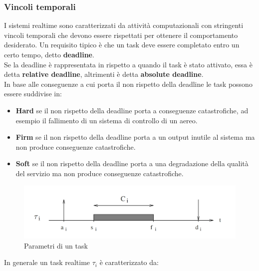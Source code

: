 \documentclass[12pt]{article}
\begin{document}
\subsubsection{Vincoli temporali}
I sistemi realtime sono caratterizzati da attività computazionali con stringenti vincoli temporali che devono essere rispettati per ottenere il comportamento desiderato.
Un requisito tipico è che un task deve essere completato entro un certo tempo, detto \textbf{deadline}.\\
Se la deadline è rappresentata in rispetto a quando il task è stato attivato, essa è detta \textbf{relative deadline}, altrimenti è detta \textbf{absolute deadline}.\\
In base alle conseguenze a cui porta il non rispetto della deadline le task possono essere suddivise in:
\begin{itemize}
    \item \textbf{Hard} se il non rispetto della deadline porta a conseguenze catastrofiche, ad esempio il fallimento di un sistema di controllo di un aereo.
    \item \textbf{Firm} se il non rispetto della deadline porta a un output inutile al sistema ma non produce conseguenze catastrofiche.
    \item \textbf{Soft} se il non rispetto della deadline porta a una degradazione della qualità del servizio ma non produce conseguenze catastrofiche.
\end{itemize}
\begin{figure}[h]
    \includegraphics[width=\textwidth]{pictures/parametriTask.png}
    \caption{Parametri di un task}
\end{figure}
In generale un task realtime $\tau_i$ è caratterizzato da:
\end{document}
